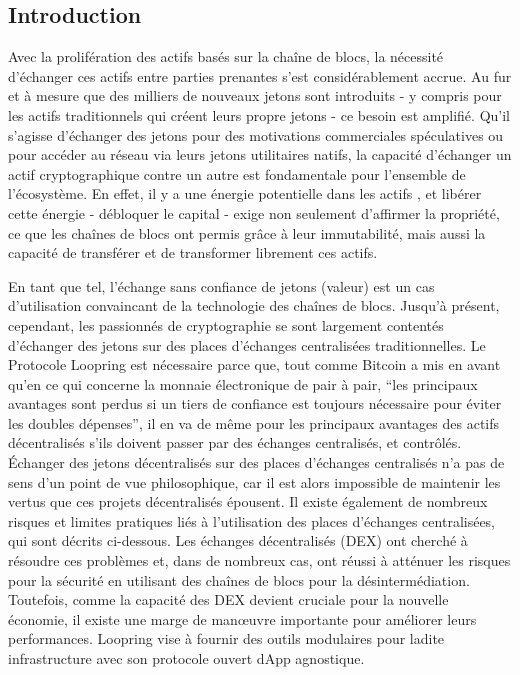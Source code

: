 \documentclass[UTF8,nofonts]{article}
\begin{document}
\begin{multicols}{2}
\section{Introduction\label{sec:introduction}}

Avec la prolifération des actifs basés sur la chaîne de blocs, la nécessité d'échanger ces actifs entre parties prenantes s'est considérablement accrue. Au fur et à mesure que des milliers de nouveaux jetons sont introduits - y compris pour les actifs traditionnels qui créent leurs propre jetons - ce besoin est amplifié. Qu'il s'agisse d'échanger des jetons pour des motivations commerciales spéculatives ou pour accéder au réseau via leurs jetons utilitaires natifs, la capacité d'échanger un actif cryptographique contre un autre est fondamentale pour l'ensemble de l'écosystème. En effet, il y a une énergie potentielle dans les actifs \cite{desotocapital}, et libérer cette énergie - débloquer le capital - exige non seulement d'affirmer la propriété, ce que les chaînes de blocs ont permis grâce à leur immutabilité, mais aussi la capacité de transférer et de transformer librement ces actifs. 
 
En tant que tel, l'échange sans confiance de jetons (valeur) est un cas d'utilisation convaincant de la technologie des chaînes de blocs. Jusqu'à présent, cependant, les passionnés de cryptographie se sont largement contentés d'échanger des jetons sur des places d'échanges centralisées traditionnelles. Le Protocole Loopring est nécessaire parce que, tout comme Bitcoin \cite{nakamoto2008bitcoin} a mis en avant qu'en ce qui concerne la monnaie électronique de pair à pair, \enquote{les principaux avantages sont perdus si un tiers de confiance est toujours nécessaire pour éviter les doubles dépenses}, il en va de même pour les principaux avantages des actifs décentralisés s'ils doivent passer par des échanges centralisés, et contrôlés.
Échanger des jetons décentralisés sur des places d’échanges centralisés n'a pas de sens d'un point de vue philosophique, car il est alors impossible de maintenir les vertus que ces projets décentralisés épousent. Il existe également de nombreux risques et limites pratiques liés à l'utilisation des places d'échanges centralisées, qui sont décrits ci-dessous. Les échanges décentralisés (DEX) \cite{schuh2015bitshares} \cite{bancor} \cite{bancor} \cite{kyber} ont cherché à résoudre ces problèmes et, dans de nombreux cas, ont réussi à atténuer les risques pour la sécurité en utilisant des chaînes de blocs pour la désintermédiation. Toutefois, comme la capacité des DEX devient cruciale pour la nouvelle économie, il existe une marge de manœuvre importante pour améliorer leurs performances. Loopring vise à fournir des outils modulaires pour ladite infrastructure avec son protocole ouvert dApp agnostique.


\end{multicols}
\end{document}
